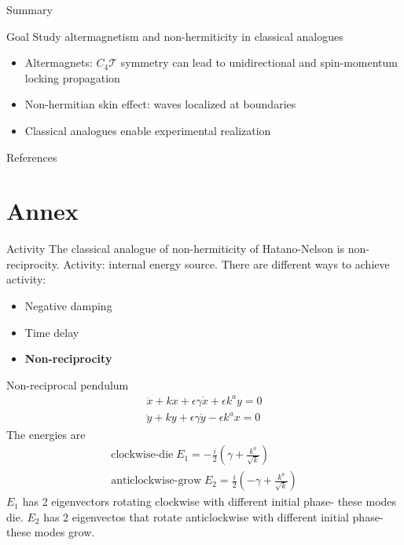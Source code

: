 \documentclass[usepdftitle=false]{beamer}
\newcommand{\xd}{\dot{x}}
\newcommand{\xdd}{\ddot{x}}
\newcommand{\yd}{\dot{y}}
\newcommand{\ydd}{\ddot{y}}
\begin{document}
\begin{frame}{Summary}
    \begin{alertblock}{Goal}
        Study altermagnetism and non-hermiticity in classical analogues 
    \end{alertblock}
    \vfill
    \begin{itemize}
        \item Altermagnets: $C_4\mathcal{T}$ symmetry can lead to unidirectional and spin-momentum locking propagation \vfill
        \item Non-hermitian skin effect: waves localized at boundaries \vfill
        \item Classical analogues enable experimental realization
    \end{itemize}
\end{frame}

\begin{frame}{References}
    
    \nocite{*}
\end{frame}

\section*{Annex}

\begin{frame}[noframenumbering]{Activity}
    The classical analogue of non-hermiticity of Hatano-Nelson is non-reciprocity. \pause
    \vfill
    Activity: internal energy source. \pause 
    \vfill
    There are different ways to achieve activity:  \pause
    \begin{itemize}
        \item Negative damping \pause
        \item Time delay \pause 
        \item \textbf{Non-reciprocity}
    \end{itemize}
\end{frame}

\begin{frame}[noframenumbering]{Non-reciprocal pendulum}
    \begin{align}
        \xdd +kx + \epsilon \gamma \xd +\epsilon k^ay = 0 \\
        \ydd +ky + \epsilon \gamma \yd -\epsilon k^ax = 0 
    \end{align}
    The energies are 
    \begin{align}
        \text{clockwise-die} \; E_1 = -\frac{i}{2}\left(\gamma + \frac{k^a}{\sqrt{k}}\right) \\
        \text{anticlockwise-grow} \; E_2 = \frac{i}{2}\left(-\gamma + \frac{k^a}{\sqrt{k}}\right)
    \end{align}
    $E_1$ has 2 eigenvectors rotating clockwise with different initial phase- these modes die.
    $E_2$ has 2 eigenvectos that rotate anticlockwise with different initial phase- these modes grow.
\end{frame}
\end{document}
